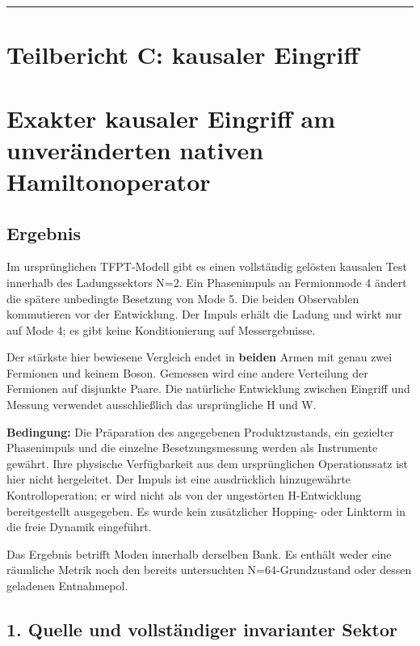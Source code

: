 \begin{center}\rule{0.5\linewidth}{0.5pt}\end{center}

\section{Teilbericht C: kausaler
Eingriff}\label{teilbericht-c-kausaler-eingriff}

\section{Exakter kausaler Eingriff am unveränderten nativen
Hamiltonoperator}\label{exakter-kausaler-eingriff-am-unveruxe4nderten-nativen-hamiltonoperator}

\subsection{Ergebnis}\label{ergebnis-3}

Im ursprünglichen TFPT-Modell gibt es einen vollständig gelösten
kausalen Test innerhalb des Ladungssektors N=2. Ein Phasenimpuls an
Fermionmode 4 ändert die spätere unbedingte Besetzung von Mode 5. Die
beiden Observablen kommutieren vor der Entwicklung. Der Impuls erhält
die Ladung und wirkt nur auf Mode 4; es gibt keine Konditionierung auf
Messergebnisse.

Der stärkste hier bewiesene Vergleich endet in \textbf{beiden} Armen mit
genau zwei Fermionen und keinem Boson. Gemessen wird eine andere
Verteilung der Fermionen auf disjunkte Paare. Die natürliche Entwicklung
zwischen Eingriff und Messung verwendet ausschließlich das ursprüngliche
H und W.

\textbf{Bedingung:} Die Präparation des angegebenen Produktzustands, ein
gezielter Phasenimpuls und die einzelne Besetzungsmessung werden als
Instrumente gewährt. Ihre physische Verfügbarkeit aus dem ursprünglichen
Operationssatz ist hier nicht hergeleitet. Der Impuls ist eine
ausdrücklich hinzugewährte Kontrolloperation; er wird nicht als von der
ungestörten H-Entwicklung bereitgestellt ausgegeben. Es wurde kein
zusätzlicher Hopping- oder Linkterm in die freie Dynamik eingeführt.

Das Ergebnis betrifft Moden innerhalb derselben Bank. Es enthält weder
eine räumliche Metrik noch den bereits untersuchten N=64-Grundzustand
oder dessen geladenen Entnahmepol.

\subsection{1. Quelle und vollständiger invarianter
Sektor}\label{quelle-und-vollstuxe4ndiger-invarianter-sektor}


